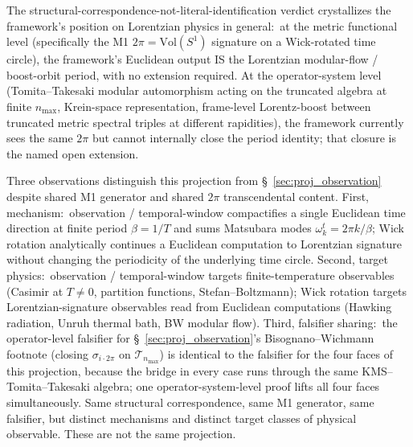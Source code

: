 \documentclass[11pt]{article}
\begin{document}
The structural-correspondence-not-literal-identification verdict
crystallizes the framework's position on Lorentzian physics in
general:\ at the metric functional level (specifically the M1
$2\pi = \mathrm{Vol}(S^1)$ signature on a Wick-rotated time circle),
the framework's Euclidean output IS the Lorentzian modular-flow /
boost-orbit period, with no extension required.  At the
operator-system level (Tomita--Takesaki modular automorphism acting
on the truncated algebra at finite $n_{\max}$, Krein-space
representation, frame-level Lorentz-boost between truncated metric
spectral triples at different rapidities), the framework currently
sees the same $2\pi$ but cannot internally close the period
identity; that closure is the named open extension.

Three observations distinguish this projection from
\S~\ref{sec:proj_observation} despite shared M1 generator and
shared $2\pi$ transcendental content.
First, mechanism:\ observation / temporal-window compactifies a
single Euclidean time direction at finite period $\beta = 1/T$ and
sums Matsubara modes $\omega_k^t = 2\pi k / \beta$; Wick rotation
analytically continues a Euclidean computation to Lorentzian
signature without changing the periodicity of the underlying time
circle.
Second, target physics:\ observation / temporal-window targets
finite-temperature observables (Casimir at $T \neq 0$, partition
functions, Stefan--Boltzmann); Wick rotation targets
Lorentzian-signature observables read from Euclidean computations
(Hawking radiation, Unruh thermal bath, BW modular flow).
Third, falsifier sharing:\ the operator-level falsifier for
\S~\ref{sec:proj_observation}'s Bisognano--Wichmann footnote
(closing $\sigma_{i\cdot 2\pi}$ on $\mathcal{T}_{n_{\max}}$) is
identical to the falsifier for the four faces of this projection,
because the bridge in every case runs through the same
KMS--Tomita--Takesaki algebra; one operator-system-level proof
lifts all four faces simultaneously.  Same structural correspondence,
same M1 generator, same falsifier, but distinct mechanisms and
distinct target classes of physical observable.  These are not the
same projection.
\end{document}

